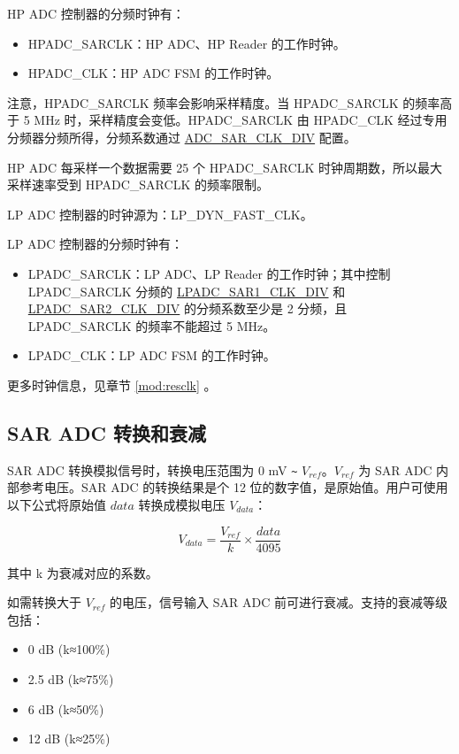 \documentclass[main\_\_CN.tex]{subfiles}
\begin{document}
HP ADC 控制器的分频时钟有：
    \begin{itemize}
        \item HPADC\_SARCLK：HP ADC、HP Reader 的工作时钟。
        \item HPADC\_CLK：HP ADC FSM 的工作时钟。
    \end{itemize}
注意，HPADC\_SARCLK 频率会影响采样精度。当 HPADC\_SARCLK 的频率高于 5 MHz 时，采样精度会变低。HPADC\_SARCLK 由 HPADC\_CLK 经过专用分频器分频所得，分频系数通过 \hyperref[fielddesc:ADCSARCLKDIV]{ADC\_SAR\_CLK\_DIV} 配置。

HP ADC 每采样一个数据需要 25 个 HPADC\_SARCLK 时钟周期数，所以最大采样速率受到 HPADC\_SARCLK 的频率限制。

LP ADC 控制器的时钟源为：LP\_DYN\_FAST\_CLK。

LP ADC 控制器的分频时钟有：
    \begin{itemize}
        \item LPADC\_SARCLK：LP ADC、LP Reader 的工作时钟；其中控制 LPADC\_SARCLK 分频的 \hyperref[fielddesc:LPADCSAR1CLKDIV]{LPADC\_SAR1\_CLK\_DIV} 和 \hyperref[fielddesc:LPADCSAR2CLKDIV]{LPADC\_SAR2\_CLK\_DIV} 的分频系数至少是 2 分频，且 LPADC\_SARCLK 的频率不能超过 5 MHz。
        \item LPADC\_CLK：LP ADC FSM 的工作时钟。
    \end{itemize}

更多时钟信息，见章节 \ref{mod:resclk} \textit{}。

\subsection{SAR ADC 转换和衰减}

SAR ADC 转换模拟信号时，转换电压范围为 0 mV \verb+~+ \(V_{ref}\)。\(V_{ref}\) 为 SAR ADC 内部参考电压。SAR ADC 的转换结果是个 12 位的数字值，是原始值。用户可使用以下公式将原始值 \(data\) 转换成模拟电压 \(V_{data}\)：

    \[
    V_{data} = \frac{V_{ref}}{k}\times{\frac{data}{4095}}
    \]

其中 k 为衰减对应的系数。

如需转换大于 \(V_{ref}\) 的电压，信号输入 SAR ADC 前可进行衰减。支持的衰减等级包括：

\begin{itemize}
    \item 0 dB (k≈100\%)
    \item 2.5 dB (k≈75\%)
    \item 6 dB (k≈50\%)
    \item 12 dB (k≈25\%)
\end{itemize}
\end{document}

